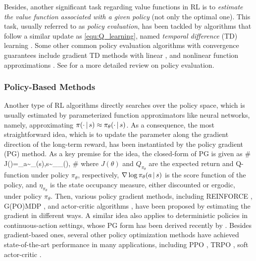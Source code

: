 Besides, another significant task regarding value functions in RL is  to \emph{estimate the value function associated with a  given policy} (not only the optimal one). This task, usually referred to as \emph{policy evaluation}, has been tackled by  algorithms that follow a  similar update as \eqref{equ:Q_learning}, named  \emph{temporal difference} (TD) learning \cite{tesauro1995temporal,tsitsiklis1997analysis,sutton2018reinforcement}. Some other common policy evaluation algorithms with convergence guarantees include gradient TD methods  with linear \cite{sutton2008convergent,sutton2009fast,liu2015finite}, and nonlinear function approximations   \cite{bhatnagar2009convergent}. See \cite{dann2014policy} for a more detailed review on policy evaluation. 

\subsubsection{Policy-Based Methods} \label{sec:policyRL}
Another type of   RL algorithms directly searches over the policy space, which is usually estimated by parameterized function approximators like neural networks, namely, approximating  $\pi(\cdot{\,|\,} s)\approx\pi_\theta(\cdot{\,|\,} s)$.  As a consequence, the most  straightforward idea, which is to update the parameter along the gradient direction of the long-term reward, has been instantiated by the  policy gradient (PG) method.    
As a key premise for the idea, the closed-form of PG is given as \cite{sutton2000policy}  
\#\label{equ:policy_grad}
\nabla J(\theta)=\EE_{a\sim\pi_\theta(\cdot\given s),s\sim\eta_{\pi_\theta}(\cdot)},
\#
where $J(\theta)$ and $Q_{\pi_\theta}$ are  the expected return and Q-function under policy $\pi_\theta$, respectively,   $\nabla\log\pi_\theta(a{\,|\,} s)$ is the score function of the policy, and $\eta_{\pi_\theta}$ is the state occupancy measure, either discounted or ergodic, under policy $\pi_\theta$.  
Then, various policy gradient methods, including  REINFORCE {\cite{williams1992simple}}, G(PO)MDP {\cite{baxter2001infinite}}, and actor-critic algorithms \cite{konda2000actor,bhatnagar2009natural}, have been proposed by estimating the gradient in different ways.  A similar idea also applies to deterministic policies in continuous-action settings, whose PG form has been derived recently  by \cite{silver2014deterministic}. 
Besides gradient-based ones, several other policy optimization methods have achieved state-of-the-art performance in many applications, including PPO  \cite{schulman2017proximal},  TRPO \cite{schulman2015trust}, soft actor-critic \cite{haarnoja2018soft}.  
 

